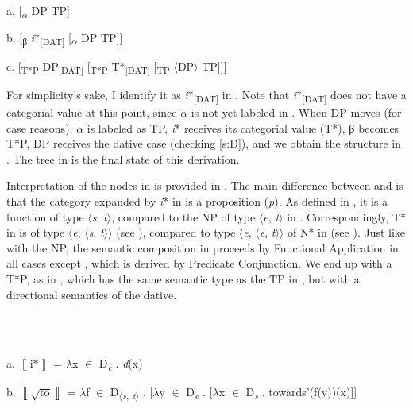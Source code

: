 \documentclass[output=paper,modfonts,nonflat]{langsci/langscibook}
\begin{document}
          a.  [\textsubscript{${\alpha}$} DP TP]

  b.  [\textsubscript{β} \textit{i}*\textsubscript{[DAT]} [\textsubscript{${\alpha}$} DP TP]]  

  c.    [\textsubscript{T*P} DP\textsubscript{[DAT]} [\textsubscript{T*P} T*\textsubscript{[DAT]} [\textsubscript{TP} ${\langle}$DP${\rangle}$ TP]]]   

For simplicity’s sake, I identify it as \textit{i}*\textsubscript{[DAT]} in . Note that \textit{i}*\textsubscript{[DAT]} does not have a categorial value at this point, since ${\alpha}$ is not yet labeled in . When DP moves (for case reasons), ${\alpha}$ is labeled as TP, \textit{i}* receives its categorial value (T*), β becomes T*P, DP receives the dative case (checking [s:D]), and we obtain the structure in . The tree in  is the final state of this derivation.

Interpretation of the nodes in  is provided in . The main difference between  and  is that the category expanded by \textit{i}* in  is a proposition (\textit{p}). As defined in , it is a function of type ${\langle}$\textit{s}, \textit{t}${\rangle}$, compared to the NP of type ${\langle}$\textit{e}, \textit{t}${\rangle}$ in . Correspondingly, T* in  is of type ${\langle}$\textit{e}, ${\langle}$\textit{s}, \textit{t}${\rangle}{\rangle}$ (see ), compared to type ${\langle}$\textit{e}, ${\langle}$\textit{e}, \textit{t}${\rangle}{\rangle}$ of N* in  (see ). Just like with the NP, the semantic composition in  proceeds by Functional Application in all cases except , which is derived by Predicate Conjunction. We end up with a T*P, as in , which has the same semantic type as the TP in , but with a directional semantics of the dative.     

\ea%
    \label{ex:key:34}
    \gll\\
        \\
    \glt
    \z

          a.   $\left\llbracket \text{i*}\right\rrbracket $ = ${\lambda}$x ${\in}$ D\textit{\textsubscript{e}} . \textit{d}(x)   

  b.   $\left\llbracket \sqrt{\text{to}}\right\rrbracket $ = ${\lambda}$f ${\in}$ D\textsubscript{${\langle}$}\textit{\textsubscript{s}}\textsubscript{,} \textit{\textsubscript{t}}\textsubscript{${\rangle}$} . [${\lambda}$y ${\in}$ D\textit{\textsubscript{e}} . [${\lambda}$x ${\in}$ D\textit{\textsubscript{s}} . towards'(f(y))(x)]]  
\end{document}
